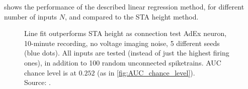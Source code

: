 
 shows the performance of the described linear regression method, for different number of inputs $N$, and compared to the STA height method.

\begin{figure}
    \captionn
        {Line fit outperforms STA height as connection test}
        {AdEx neuron, 10-minute recording, no voltage imaging noise,  5 different seeds (blue dots). All inputs are tested (instead of just the highest firing ones), in addition to 100 random unconnected spiketrains. AUC chance level is at $0.252$ (as in \cref{fig:AUC_chance_level}). \\
        Source: .}
    \label{fig:N_sweep__AUC__upstroke_vs_STA}
\end{figure}









